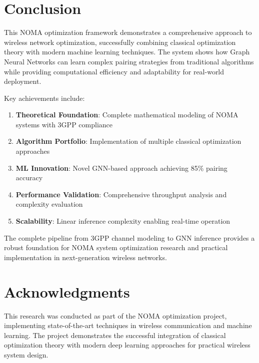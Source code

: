 \documentclass[11pt,a4paper]{article}
\begin{document}
\section{Conclusion}

This NOMA optimization framework demonstrates a comprehensive approach to wireless network optimization, successfully combining classical optimization theory with modern machine learning techniques. The system shows how Graph Neural Networks can learn complex pairing strategies from traditional algorithms while providing computational efficiency and adaptability for real-world deployment.

Key achievements include:

\begin{enumerate}
    \item \textbf{Theoretical Foundation}: Complete mathematical modeling of NOMA systems with 3GPP compliance
    \item \textbf{Algorithm Portfolio}: Implementation of multiple classical optimization approaches
    \item \textbf{ML Innovation}: Novel GNN-based approach achieving 85\% pairing accuracy
    \item \textbf{Performance Validation}: Comprehensive throughput analysis and complexity evaluation
    \item \textbf{Scalability}: Linear inference complexity enabling real-time operation
\end{enumerate}

The complete pipeline from 3GPP channel modeling to GNN inference provides a robust foundation for NOMA system optimization research and practical implementation in next-generation wireless networks.

\section*{Acknowledgments}

This research was conducted as part of the NOMA optimization project, implementing state-of-the-art techniques in wireless communication and machine learning. The project demonstrates the successful integration of classical optimization theory with modern deep learning approaches for practical wireless system design.
\end{document}
